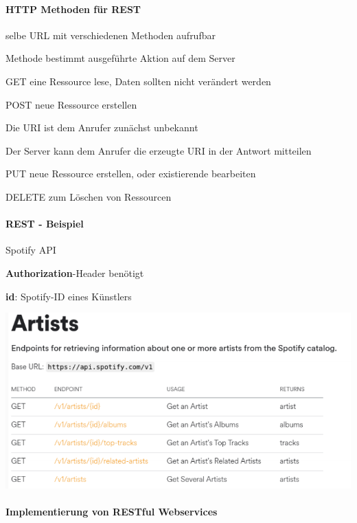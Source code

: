 \documentclass[10pt]{article}
\begin{document}
\paragraph{HTTP Methoden für REST}

\begin{itemize*}
  \item selbe URL mit verschiedenen Methoden aufrufbar
  \item Methode bestimmt ausgeführte Aktion auf dem Server
\end{itemize*}
\begin{description*}
  \item[GET] eine Ressource lese, Daten sollten nicht verändert werden
  \item[POST] neue Ressource erstellen
  \begin{itemize*}
    \item Die URI ist dem Anrufer zunächst unbekannt
    \item Der Server kann dem Anrufer die erzeugte URI in der Antwort mitteilen
  \end{itemize*}
  \item[PUT] neue Ressource erstellen, oder existierende bearbeiten
  \item[DELETE] zum Löschen von Ressourcen
\end{description*}

\paragraph{REST - Beispiel}

Spotify API
\begin{itemize*}
  \item \textbf{Authorization}-Header benötigt
  \item \textbf{id}: Spotify-ID eines Künstlers
\end{itemize*}
\begin{center}
  \includegraphics[width=0.4\linewidth]{Assets/Programmierparadigmen-spotify-api}
\end{center}

\paragraph{Implementierung von RESTful Webservices}
\end{document}
